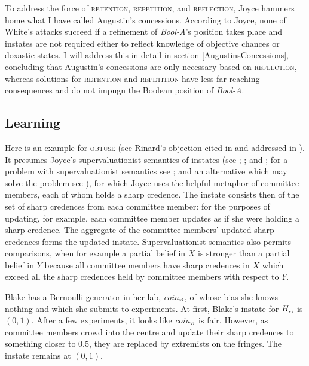 \documentclass[11pt]{article}
\newcommand{\anderson}[0]{\textit{Bool-A}}
\begin{document}
To address the force of \textsc{retention}, \textsc{repetition}, and
\textsc{reflection}, Joyce hammers home what I have called Augustin's
concessions. According to Joyce, none of White's attacks succeed if a
refinement of {\anderson}'s position takes place and instates are not
required either to reflect knowledge of objective chances or doxastic
states. I will address this in detail in section
\ref{AugustinsConcessions}, concluding that Augustin's concessions are
only necessary based on \textsc{reflection}, whereas solutions for
\textsc{retention} and \textsc{repetition} have less far-reaching
consequences and do not impugn the Boolean position of {\anderson}.

\subsection{Learning}
\label{learning}

Here is an example for \textsc{obtuse} (see Rinard's objection cited
in  and addressed in ).
It presumes Joyce's supervaluationist semantics of instates (see
; ; and
; for a problem with supervaluationist semantics
see ; and an alternative which may solve the
problem see ), for which Joyce uses the
helpful metaphor of committee members, each of whom holds a sharp
credence. The instate consists then of the set of sharp credences from
each committee member: for the purposes of updating, for example, each
committee member updates as if she were holding a sharp credence. The
aggregate of the committee members' updated sharp credences forms the
updated instate. Supervaluationist semantics also permits comparisons,
when for example a partial belief in $X$ is stronger than a partial
belief in $Y$ because all committee members have sharp credences in
$X$ which exceed all the sharp credences held by committee members
with respect to $Y$.

\begin{quotex}
  \label{ex:learning} Blake has a Bernoulli
  generator in her lab, \textit{coin}$_{\mbox{\tiny{vi}}}$, of whose
  bias she knows nothing and which she submits to experiments. At first,
  Blake's instate for $H_{\mbox{\tiny{vi}}}$ is $(0,1)$. After a few
  experiments, it looks like \textit{coin}$_{\mbox{\tiny{vi}}}$ is
  fair. However, as committee members crowd into the centre and update
  their sharp credences to something closer to $0.5$, they are
  replaced by extremists on the fringes. The instate remains at
  $(0,1)$. 
\end{quotex}
\end{document}
